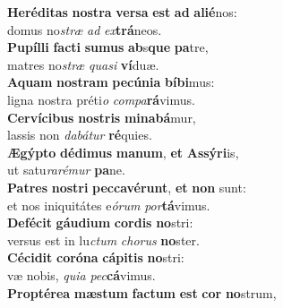 \evenverse \textbf{He}\textbf{ré}\textbf{di}\textbf{tas} \textbf{no}\textbf{stra} \textbf{ver}\textbf{sa} \textbf{est} \textbf{ad} \textbf{a}\textbf{li}\textbf{é}nos:~\*\\
\evenverse domus no\textit{stræ} \textit{ad} \textit{ex}\textbf{trá}neos.\\
\oddverse \textbf{Pu}\textbf{píl}\textbf{li} \textbf{fa}\textbf{cti} \textbf{su}\textbf{mus} \textbf{ab}s\textbf{que} \textbf{pa}tre,~\*\\
\oddverse matres no\textit{stræ} \textit{qua}\textit{si} \textbf{ví}duæ.\\
\evenverse \textbf{A}\textbf{quam} \textbf{no}\textbf{stram} \textbf{pe}\textbf{cú}\textbf{ni}\textbf{a} \textbf{bí}\textbf{bi}mus:~\*\\
\evenverse ligna nostra préti\textit{o} \textit{com}\textit{pa}\textbf{rá}vimus.\\
\oddverse \textbf{Cer}\textbf{ví}\textbf{ci}\textbf{bus} \textbf{no}\textbf{stris} \textbf{mi}\textbf{na}\textbf{bá}mur,~\*\\
\oddverse lassis non \textit{da}\textit{bá}\textit{tur} \textbf{ré}quies.\\
\evenverse \textbf{Æ}\textbf{gýp}\textbf{to} \textbf{dé}\textbf{di}\textbf{mus} \textbf{ma}\textbf{num}, \textbf{et} \textbf{As}\textbf{sý}\textbf{ri}is,~\*\\
\evenverse ut satu\textit{ra}\textit{ré}\textit{mur} \textbf{pa}ne.\\
\oddverse \textbf{Pa}\textbf{tres} \textbf{no}\textbf{stri} \textbf{pec}\textbf{ca}\textbf{vé}\textbf{runt}, \textbf{et} \textbf{non} sunt:~\*\\
\oddverse et nos iniquitátes e\textit{ó}\textit{rum} \textit{por}\textbf{tá}vimus.\\
\evenverse \textbf{De}\textbf{fé}\textbf{cit} \textbf{gáu}\textbf{di}\textbf{um} \textbf{cor}\textbf{dis} \textbf{no}stri:~\*\\
\evenverse versus est in lu\textit{ctum} \textit{cho}\textit{rus} \textbf{no}ster.\\
\oddverse \textbf{Cé}\textbf{ci}\textbf{dit} \textbf{co}\textbf{ró}\textbf{na} \textbf{cá}\textbf{pi}\textbf{tis} \textbf{no}stri:~\*\\
\oddverse væ nobis, \textit{qui}\textit{a} \textit{pec}\textbf{cá}vimus.\\
\evenverse \textbf{Prop}\textbf{té}\textbf{re}\textbf{a} \textbf{mæ}\textbf{stum} \textbf{fa}\textbf{ctum} \textbf{est} \textbf{cor} \textbf{no}strum,~\*\\
